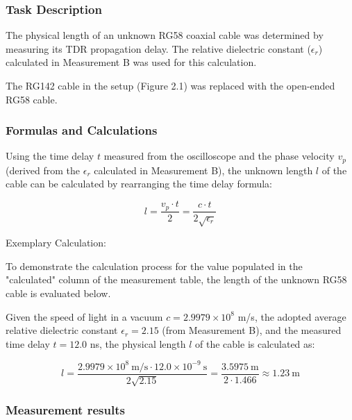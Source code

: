 \subsubsection{Task Description}
The physical length of an unknown RG58 coaxial cable was determined by measuring its TDR propagation delay. The relative dielectric constant ($\epsilon_r$) calculated in Measurement B was used for this calculation.

The RG142 cable in the setup (Figure 2.1) was replaced with the open-ended RG58 cable.

\subsubsection{Formulas and Calculations}

Using the time delay $t$ measured from the oscilloscope and the phase velocity $v_p$ (derived from the $\epsilon_r$ calculated in Measurement B), the unknown length $l$ of the cable can be calculated by rearranging the time delay formula:

\begin{equation}
    l = \frac{v_p \cdot t}{2} = \frac{c \cdot t}{2\sqrt{\epsilon_r}}
\end{equation}

Exemplary Calculation:

To demonstrate the calculation process for the value populated in the "calculated" column of the measurement table, the length of the unknown RG58 cable is evaluated below.

Given the speed of light in a vacuum $c = 2.9979 \times 10^8$ m/s, the adopted average relative dielectric constant $\epsilon_r = 2.15$ (from Measurement B), and the measured time delay $t = 12.0$ ns, the physical length $l$ of the cable is calculated as:

\begin{equation}
    l = \frac{2.9979 \times 10^8\ \text{m/s} \cdot 12.0 \times 10^{-9}\ \text{s}}{2\sqrt{2.15}} = \frac{3.5975\ \text{m}}{2 \cdot 1.466} \approx 1.23\ \text{m}
\end{equation}

\subsubsection{Measurement results}


